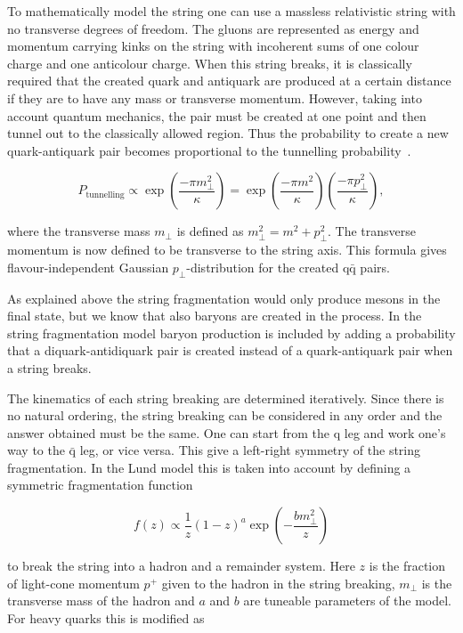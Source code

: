 To mathematically model the string one can use a massless relativistic string with no transverse degrees of freedom. The gluons are represented as energy and momentum carrying kinks on the string with incoherent sums of one colour charge and one anticolour charge. When this string breaks, it is classically required that the created quark and antiquark are produced at a certain distance if they are to have any mass or transverse momentum. However, taking into account quantum mechanics, the pair must be created at one point and then tunnel out to the classically allowed region. Thus the probability to create a new quark-antiquark pair becomes proportional to the tunnelling probability~\cite{ANDERSSON198331}.


\begin{equation}
P_\mathrm{tunnelling} \propto \exp \left(\frac{-\pi m_\perp^2}{\kappa} \right) = \exp \left(\frac{-\pi m^2}{\kappa} \right) \left(\frac{-\pi p_\perp^2}{\kappa} \right),
\end{equation}

\noindent where the transverse mass $m_\perp$ is defined as $m_\perp^2 = m^2 + p_\perp ^2$. The transverse momentum is now defined to be transverse to the string axis. This formula gives flavour-independent Gaussian $p_\perp$-distribution for the created $\mathrm{q \bar q}$ pairs.

As explained above the string fragmentation would only produce mesons in the final state, but we know that also baryons are created in the process. In the string fragmentation model baryon production is included by adding a probability that a diquark-antidiquark pair is created instead of a quark-antiquark pair when a string breaks.

The kinematics of each string breaking are determined iteratively. Since there is no natural ordering, the string breaking can be considered in any order and the answer obtained must be the same. One can start from the q leg and work one's way to the $\bar{\mathrm{q}}$ leg, or vice versa. This give a left-right symmetry of the string fragmentation. In the Lund model this is taken into account by defining a symmetric fragmentation function

\begin{equation}
f\left(z\right) \propto \frac{1}{z} \left(1-z\right)^a \exp \left(-\frac{b m_\perp ^2}{z} \right)
\label{eq:symmetric}
\end{equation}

\noindent to break the string into a hadron and a remainder system. Here $z$ is the fraction of light-cone momentum $p^+$ given to the hadron in the string breaking, $m_\perp$ is the transverse mass of the hadron and $a$ and $b$ are tuneable parameters of the model. For heavy quarks this is modified as 


